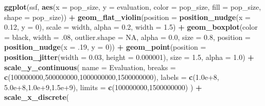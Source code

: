 \documentclass[
]{book}
\newenvironment{Shaded}{\begin{snugshade}}{\end{snugshade}}
\newcommand{\AttributeTok}[1]{\textcolor[rgb]{0.13,0.29,0.53}{#1}}
\newcommand{\ConstantTok}[1]{\textcolor[rgb]{0.56,0.35,0.01}{#1}}
\newcommand{\DecValTok}[1]{\textcolor[rgb]{0.00,0.00,0.81}{#1}}
\newcommand{\FloatTok}[1]{\textcolor[rgb]{0.00,0.00,0.81}{#1}}
\newcommand{\FunctionTok}[1]{\textcolor[rgb]{0.13,0.29,0.53}{\textbf{#1}}}
\newcommand{\NormalTok}[1]{#1}
\newcommand{\SpecialCharTok}[1]{\textcolor[rgb]{0.81,0.36,0.00}{\textbf{#1}}}
\newcommand{\StringTok}[1]{\textcolor[rgb]{0.31,0.60,0.02}{#1}}
\begin{document}
\begin{Shaded}
\begin{Highlighting}[]
\FunctionTok{ggplot}\NormalTok{(ssf, }\FunctionTok{aes}\NormalTok{(}\AttributeTok{x =}\NormalTok{ pop\_size, }\AttributeTok{y =}\NormalTok{ evaluation, }\AttributeTok{color =}\NormalTok{ pop\_size, }\AttributeTok{fill =}\NormalTok{ pop\_size, }\AttributeTok{shape =}\NormalTok{ pop\_size)) }\SpecialCharTok{+}
  \FunctionTok{geom\_flat\_violin}\NormalTok{(}\AttributeTok{position =} \FunctionTok{position\_nudge}\NormalTok{(}\AttributeTok{x =} \FloatTok{0.12}\NormalTok{, }\AttributeTok{y =} \DecValTok{0}\NormalTok{), }\AttributeTok{scale =} \StringTok{\textquotesingle{}width\textquotesingle{}}\NormalTok{, }\AttributeTok{alpha =} \FloatTok{0.2}\NormalTok{, }\AttributeTok{width =} \FloatTok{1.5}\NormalTok{) }\SpecialCharTok{+}
  \FunctionTok{geom\_boxplot}\NormalTok{(}\AttributeTok{color =} \StringTok{\textquotesingle{}black\textquotesingle{}}\NormalTok{, }\AttributeTok{width =}\NormalTok{ .}\DecValTok{08}\NormalTok{, }\AttributeTok{outlier.shape =} \ConstantTok{NA}\NormalTok{, }\AttributeTok{alpha =} \FloatTok{0.0}\NormalTok{, }\AttributeTok{size =} \FloatTok{0.8}\NormalTok{, }\AttributeTok{position =} \FunctionTok{position\_nudge}\NormalTok{(}\AttributeTok{x =}\NormalTok{ .}\DecValTok{19}\NormalTok{, }\AttributeTok{y =} \DecValTok{0}\NormalTok{)) }\SpecialCharTok{+}
  \FunctionTok{geom\_point}\NormalTok{(}\AttributeTok{position =} \FunctionTok{position\_jitter}\NormalTok{(}\AttributeTok{width =} \FloatTok{0.03}\NormalTok{, }\AttributeTok{height =} \FloatTok{0.000001}\NormalTok{), }\AttributeTok{size =} \FloatTok{1.5}\NormalTok{, }\AttributeTok{alpha =} \FloatTok{1.0}\NormalTok{) }\SpecialCharTok{+}
  \FunctionTok{scale\_y\_continuous}\NormalTok{(}
    \AttributeTok{name =} \StringTok{\textquotesingle{}Evaluation\textquotesingle{}}\NormalTok{,}
    \AttributeTok{breaks =} \FunctionTok{c}\NormalTok{(}\DecValTok{100000000}\NormalTok{,}\DecValTok{500000000}\NormalTok{,}\DecValTok{1000000000}\NormalTok{,}\DecValTok{1500000000}\NormalTok{),}
    \AttributeTok{labels =} \FunctionTok{c}\NormalTok{(}\StringTok{\textquotesingle{}1.0e+8\textquotesingle{}}\NormalTok{, }\StringTok{\textquotesingle{}5.0e+8\textquotesingle{}}\NormalTok{,}\StringTok{\textquotesingle{}1.0e+9\textquotesingle{}}\NormalTok{,}\StringTok{\textquotesingle{}1.5e+9\textquotesingle{}}\NormalTok{),}
    \AttributeTok{limits =} \FunctionTok{c}\NormalTok{(}\DecValTok{100000000}\NormalTok{,}\DecValTok{1500000000}\NormalTok{)}
\NormalTok{    ) }\SpecialCharTok{+}
  \FunctionTok{scale\_x\_discrete}\NormalTok{(}

\end{Highlighting}
\end{Shaded}
\end{document}
